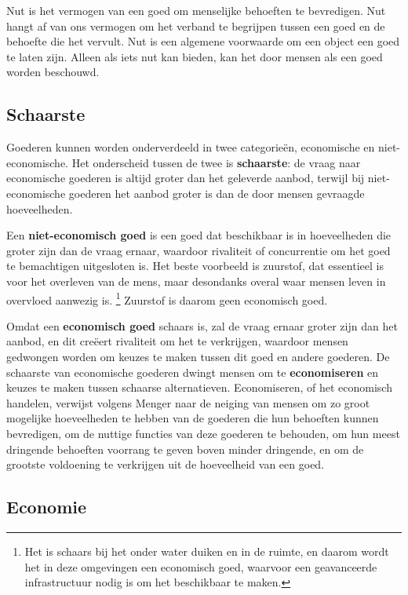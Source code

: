 \documentclass[
  a5paper,
  smalldemyvopaper,11pt,twoside,onecolumn,openright,extrafontsizes,
hidelinks]{memoir}
\begin{document}
Nut is het vermogen van een goed om menselijke behoeften te bevredigen.
Nut hangt af van ons vermogen om het verband te begrijpen tussen een
goed en de behoefte die het vervult. Nut is een algemene voorwaarde om
een object een goed te laten zijn. Alleen als iets nut kan bieden, kan
het door mensen als een goed worden beschouwd.

\subsection{Schaarste}\label{schaarste}

Goederen kunnen worden onderverdeeld in twee categorieën, economische en
niet-economische. Het onderscheid tussen de twee is \textbf{schaarste}:
de vraag naar economische goederen is altijd groter dan het geleverde
aanbod, terwijl bij niet-economische goederen het aanbod groter is dan
de door mensen gevraagde hoeveelheden.

Een \textbf{niet-economisch goed} is een goed dat beschikbaar is in
hoeveelheden die groter zijn dan de vraag ernaar, waardoor rivaliteit of
concurrentie om het goed te bemachtigen uitgesloten is. Het beste
voorbeeld is zuurstof, dat essentieel is voor het overleven van de mens,
maar desondanks overal waar mensen leven in overvloed aanwezig is.
\footnote{Het is schaars bij het onder water duiken en in de ruimte, en
  daarom wordt het in deze omgevingen een economisch goed, waarvoor een
  geavanceerde infrastructuur nodig is om het beschikbaar te maken.}
Zuurstof is daarom geen economisch goed.

Omdat een \textbf{economisch goed} schaars is, zal de vraag ernaar
groter zijn dan het aanbod, en dit creëert rivaliteit om het te
verkrijgen, waardoor mensen gedwongen worden om keuzes te maken tussen
dit goed en andere goederen. De schaarste van economische goederen
dwingt mensen om te \textbf{economiseren} en keuzes te maken tussen
schaarse alternatieven. Economiseren, of het economisch handelen,
verwijst volgens Menger naar de neiging van mensen om zo groot mogelijke
hoeveelheden te hebben van de goederen die hun behoeften kunnen
bevredigen, om de nuttige functies van deze goederen te behouden, om hun
meest dringende behoeften voorrang te geven boven minder dringende, en
om de grootste voldoening te verkrijgen uit de hoeveelheid van een goed.

\subsection{Economie}\label{economie}
\end{document}
